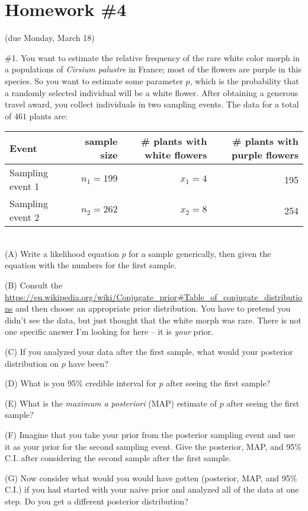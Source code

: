 \documentclass[11pt]{article}
\begin{document}
\section*{Homework \#4} (due Monday, March 18)

\#1. You want to estimate the relative frequency of the rare white color morph 
in a populations of {\em Cirsium palustre} in France; most of the flowers are purple in this
species.
So you want to estimate some parameter $p$, which is the probability that a randomly selected
individual will be a white flower.
After obtaining a generous travel award, you collect individuals in two sampling events.
The data for a total of $461$ plants are:\\
\begin{tabular}{|l|r|r|r|}
\hline
Event & sample size & \# plants with white flowers & \# plants with purple flowers \\
\hline
 Sampling event 1 & $n_1 = 199$ & $x_1=4$ & 195 \\
Sampling event 2  & $n_2 = 262$ &$x_2=8$ & 254 \\
\hline
\end{tabular}\\

(A) Write a likelihood equation $p$ for a sample generically, then given the equation with the numbers for the first sample.

(B) Consult the \url{https://en.wikipedia.org/wiki/Conjugate_prior#Table_of_conjugate_distributions} and then choose an appropriate prior distribution.
You have to pretend you didn't see the data, but just thought that the white morph was rare.
There is not one specific answer I'm looking for here -- it is {\em your} prior.

(C) If you analyzed your data after the first sample, what would your posterior distribution
on $p$ have been?

(D) What is you 95\% credible interval for $p$ after seeing the first sample? 

(E) What is the {\em maximum a posteriori} (MAP) estimate of $p$ after seeing the first sample?

(F) Imagine that you take your prior from the posterior sampling event and use it as your prior
for the second sampling event. 
Give the posterior, MAP, and 95\% C.I. after considering the second sample after the first sample.

(G) Now consider what would you would have gotten (posterior, MAP, and 95\% C.I.) if you
had started with your naive prior and analyzed all of the data at one step. 
Do you get a different posterior distribution?
\end{document}
